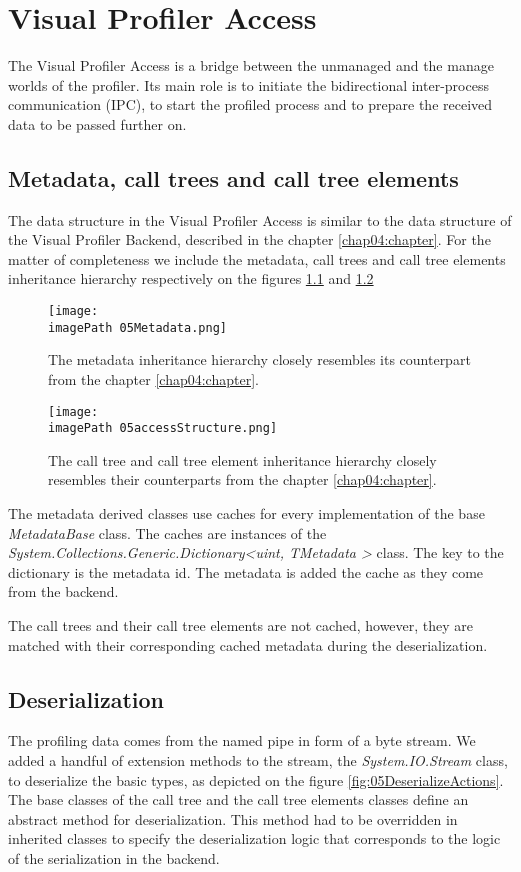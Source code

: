 \chapter{Visual Profiler Access}
The Visual Profiler Access is a bridge between the unmanaged and the manage worlds of the profiler. Its main role is to initiate the bidirectional inter-process communication (IPC), to start the profiled process and to prepare the received data to be passed further on.

\section{Metadata, call trees and call tree elements}
The data structure in the Visual Profiler Access is similar to the data structure of the Visual Profiler Backend, described in the chapter \ref{chap04:chapter}. For the matter of completeness we include the metadata, call trees and call tree elements inheritance hierarchy respectively on the figures \ref{fig:05Metadata} and \ref{fig:05accessStructure}

\begin{figure}
	\centering
		\texttt{[image: \\imagePath 05Metadata.png]}
		\caption{The metadata inheritance hierarchy closely resembles its counterpart from the chapter \ref{chap04:chapter}.}
	\label{fig:05Metadata}
\end{figure}

\begin{figure}
	\centering
		\texttt{[image: \\imagePath 05accessStructure.png]}
		\caption{The call tree and call tree element inheritance hierarchy closely resembles their counterparts from the chapter \ref{chap04:chapter}.}
	\label{fig:05accessStructure}
\end{figure}

The metadata derived classes use caches for every implementation of the base \textit{MetadataBase} class. The caches are instances of the \textit{System.Collections.Generic.Dictionary\textless uint, TMetadata \textgreater} class. The key to the dictionary is the metadata id. The metadata is added the cache as they come from the backend.

The call trees and their call tree elements are not cached, however, they are matched with their corresponding cached metadata during the deserialization.

\section{Deserialization}
The profiling data comes from the named pipe in form of a byte stream. We added a handful of extension methods to the stream, the \textit{System.IO.Stream} class, to deserialize the basic types, as depicted on the figure \ref{fig:05DeserializeActions}. The base classes of the call tree and the call tree elements classes define an abstract method for deserialization. This method had to be overridden in inherited classes to specify the deserialization logic that corresponds to the logic of the serialization in the backend.


